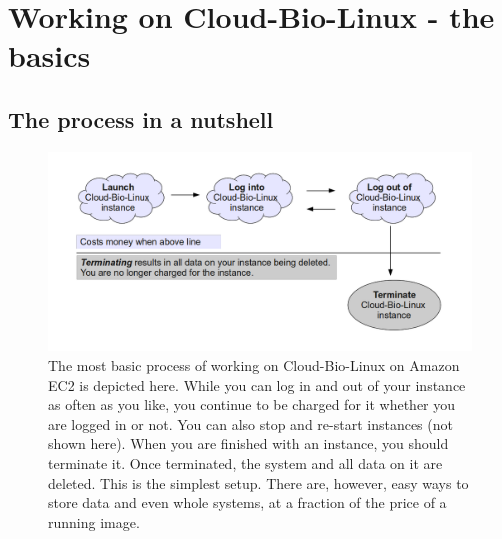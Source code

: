 \section{Working on Cloud-Bio-Linux - the basics}

\subsection{The process in a nutshell}

\begin{figure}[!hd]
	\fbox
	{
		\begin{minipage}{13cm}
\includegraphics[width=\maxwidth]{"images/nutshell"}
\caption[Start an Instance]{\label{fig:nutshell}The most basic process of working on Cloud-Bio-Linux on Amazon EC2 is depicted here. While you can log in and out of your instance as often as you like, you continue to be charged for it whether you are logged in or not. You can also stop and re-start instances (not shown here). When you are finished with an instance, you should terminate it. Once terminated, the system and all data on it are deleted. This is the simplest setup. There are, however, easy ways to store data and even whole systems, at a fraction of the price of a running image.}
		\end{minipage}
	}
\end{figure}

